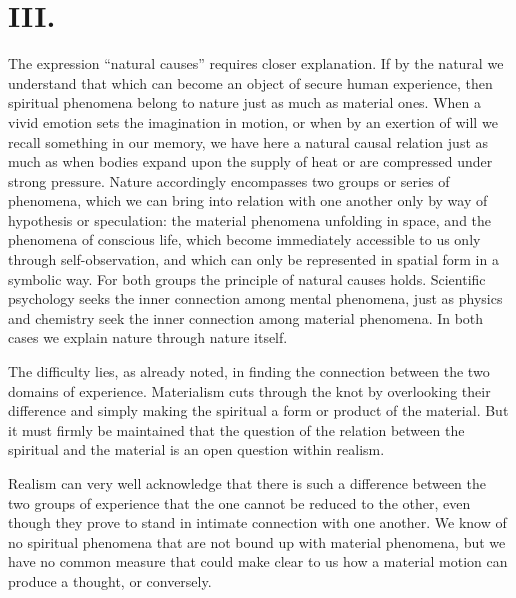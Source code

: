 \documentclass[12pt,a4paper]{article}
\newcommand{\opage}[1]{\marginnote{\footnotesize\textit{[#1]}}}
\begin{document}
\section*{III.}

The expression ``natural causes'' requires closer explanation. If by the
natural we understand that which can become an object of secure human
experience, then spiritual phenomena belong to nature just as much as
material ones. When a vivid emotion sets the imagination in motion, or
when by an exertion of will we recall something in our memory, we have
here a natural causal relation just as much as when bodies expand upon
the supply of heat or are compressed under strong pressure. Nature
accordingly encompasses two groups or series of phenomena, which we can
bring into relation with one another only by way of hypothesis or
speculation: the material phenomena unfolding in space, and the phenomena
of conscious life, which become immediately accessible to us only through
self-observation, and which can only be represented in spatial form in a
symbolic way. For both groups the principle of natural causes holds.
Scientific psychology seeks the inner connection among mental phenomena,
just as physics and chemistry seek the inner connection among material
phenomena. In both cases we explain nature through nature itself.

The difficulty lies, as already noted, in finding the connection between
the two domains of experience. Materialism cuts through the knot by
overlooking their difference and simply making the spiritual a form or
product of the material. But it must firmly be maintained that \opage{8}the
question of the relation between the spiritual and the material is an open
question within realism.

Realism can very well acknowledge that there is such a difference between
the two groups of experience that the one cannot be reduced to the other,
even though they prove to stand in intimate connection with one another.
We know of no spiritual phenomena that are not bound up with material
phenomena, but we have no common measure that could make clear to us how
a material motion can produce a thought, or conversely.
\end{document}
